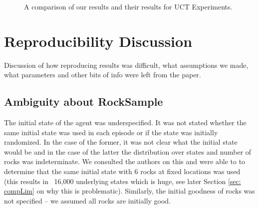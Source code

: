 \documentclass[11pt]{article} %
\begin{document}
\begin{figure}
\centering
{}
\hspace{1mm}
\caption{A comparison of our results and their results for UCT Experiments.}
\end{figure}


\section{Reproducibility Discussion}

Discussion of how reproducing results was difficult, what assumptions we made, what parameters and other bits of info were left from the paper.

\subsection{Ambiguity about RockSample}
The initial state of the agent was underspecified. It was not stated whether the same initial state was used in each episode or if the state was initially randomized. In the case of the former, it was not clear what the initial state would be and in the case of the latter the distribution over states and number of rocks was indeterminate. We consulted the authors on this and were able to to determine that the same initial state with 6 rocks at fixed locations was used (this results in ~16,000 underlying states which is huge, see later Section \ref{sec: compLim} on why this is problematic). Similarly, the initial goodness of rocks was not specified -- we assumed all rocks are initially good.
\end{document}
